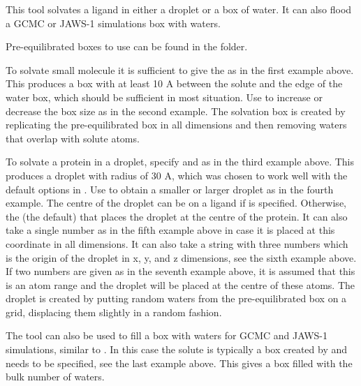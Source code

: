 \documentclass[letterpaper,10pt,english]{sphinxmanual}
\begin{document}

This tool solvates a ligand in either a droplet or a box of water. It can also flood a GCMC or JAWS-1 simulations box with waters.

Pre-equilibrated boxes to use can be found in the  folder.

To solvate small molecule it is sufficient to give the  as in the first example above. This produces a box with at least 10 A between the solute and the edge of the water box, which should be sufficient in most situation. Use  to increase or decrease the box size as in the second example. The solvation box is created by replicating the pre-equilibrated box in all dimensions and then removing waters that overlap with solute atoms.

To solvate a protein in a droplet, specify  and  as in the third example above. This produces a droplet with radius of 30 A, which was chosen to work well with the default options in . Use  to obtain a smaller or larger droplet as in the fourth example. The centre of the droplet can be on a ligand if  is specified. Otherwise, the  (the default) that places the droplet at the centre of the protein. It can also take a single number as in the fifth example above in case it is placed at this coordinate in all dimensions. It can also take a string with three numbers which is the origin of the droplet in x, y, and z dimensions, see the sixth example above. If two numbers are given as in the seventh example above, it is assumed that this is an atom range and the droplet will be placed at the centre of these atoms. The droplet is created by putting random waters from the pre-equilibrated box on a grid, displacing them slightly in a random fashion.

The tool can also be used to fill a box with waters for GCMC and JAWS-1 simulations, similar to . In this case the solute is typically a box created by  and  needs to be specified, see the last example above. This gives a box filled with the bulk number of waters.
\end{document}
